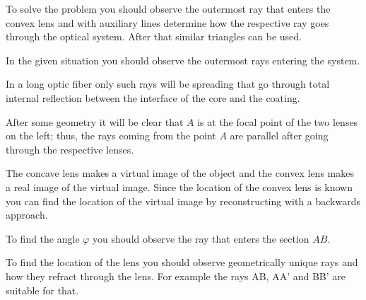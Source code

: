 \documentclass[11pt]{article}
\begin{document}
\hinteng
To solve the problem you should observe the outermost ray that enters the convex lens and with auxiliary lines determine how the respective ray goes through the optical system. After that similar triangles can be used.
\probend
\bigskip


\hinteng
In the given situation you should observe the outermost rays entering the system.
\probend
\bigskip


\hinteng
In a long optic fiber only such rays will be spreading that go through total internal reflection between the interface of the core and the coating.
\probend
\bigskip


\hinteng
After some geometry it will be clear that $A$ is at the focal point of the two lenses on the left; thus, the rays coming from the point $A$ are parallel after going through the respective lenses.
\probend
\bigskip


\hinteng
The concave lens makes a virtual image of the object and the convex lens makes a real image of the virtual image. Since the location of the convex lens is known you can find the location of the virtual image by reconstructing with a backwards approach.
\probend
\bigskip


\hinteng
To find the angle $\varphi$ you should observe the ray that enters the section $AB$.
\probend
\bigskip


\hinteng
To find the location of the lens you should observe geometrically unique rays and how they refract through the lens. For example the rays AB, AA’ and BB’ are suitable for that.
\probend
\bigskip
\end{document}

